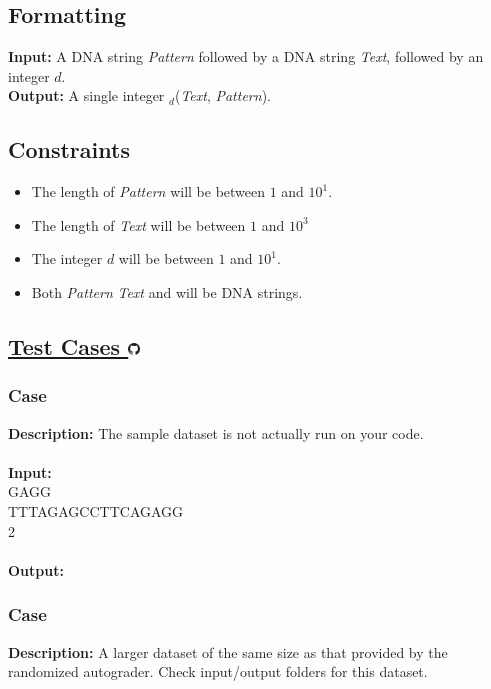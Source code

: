 \documentclass{article}
\renewcommand{\sc}[1]{\text{\scshape #1}}
\newcommand{\code}[1]{{\fontfamily{pcr}\selectfont #1}}
\newcommand{\gitlogo}{\includegraphics[height=12.5]{c0/gitlogo.png}}
\begin{document}
\subsection*{Formatting}
\textbf{Input:} A DNA string \emph{Pattern} followed by a DNA string \emph{Text}, followed by an integer $d$.\\
\noindent \textbf{Output:} A single integer \sc{Count}$_d$(\emph{Text}, \emph{Pattern}).

\subsection*{Constraints}
\begin{itemize}
    \item The length of \emph{Pattern} will be between $1$ and $10^1$.
    \item The length of \emph{Text} will be between $1$ and $10^3$
    \item The integer $d$ will be between $1$ and $10^1$.
    \item Both \emph{Pattern} \emph{Text} and will be DNA strings.
\end{itemize}
\pagebreak

\subsection*{\href{https://github.com/rjeveloff/BA_problemregister/tree/main/test_cases/chapter_1/1O}{Test Cases \gitlogo}}
\subsubsection*{Case }
\hline \vspace{5}
\textbf{Description:} The sample dataset is not actually run on your code.\\ \\
\noindent \textbf{Input:}\\
\code{GAGG\\TTTAGAGCCTTCAGAGG\\2}\\ \\
\noindent \textbf{Output:}\\
\code{4}

\subsubsection*{Case }
\hline \vspace{5}
\textbf{Description:} A larger dataset of the same size as that provided by the randomized autograder. Check input/output folders for this dataset.\\ \\
\pagebreak
\end{document}

